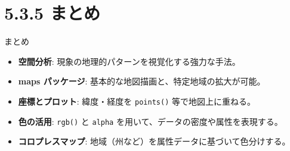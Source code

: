 \documentclass[
  ignorenonframetext,
]{beamer}
\providecommand{\tightlist}{%
  \setlength{\itemsep}{0pt}\setlength{\parskip}{0pt}}
\begin{document}
\hypertarget{ux307eux3068ux3081}{%
\section{5.3.5 まとめ}\label{ux307eux3068ux3081}}

\begin{frame}[fragile]{まとめ}
\protect\hypertarget{ux307eux3068ux3081-1}{}
\begin{itemize}
\tightlist
\item
  \textbf{空間分析}: 現象の地理的パターンを視覚化する強力な手法。
\item
  \textbf{maps パッケージ}: 基本的な地図描画と、特定地域の拡大が可能。
\item
  \textbf{座標とプロット}: 緯度・経度を \texttt{points()}
  等で地図上に重ねる。
\item
  \textbf{色の活用}: \texttt{rgb()} と \texttt{alpha}
  を用いて、データの密度や属性を表現する。
\item
  \textbf{コロプレスマップ}:
  地域（州など）を属性データに基づいて色分けする。
\end{itemize}
\end{frame}
\end{document}
